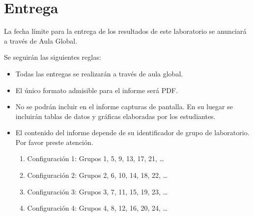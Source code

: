 \clearpage
\section{Entrega}

La fecha límite para la entrega de los resultados de este laboratorio 
se anunciará a través de Aula Global.

Se seguirán las siguientes reglas:

\begin{itemize}

  \item Todas las entregas se realizarán a través de aula global.

  \item El único formato admisible para el informe será PDF.

  \item No se podrán incluir en el informe capturas de pantalla.
        En su luegar se incluirán tablas de datos y gráficas elaboradas por los estudiantes.

  \item El contenido del informe depende de su identificador de grupo de laboratorio.
        Por favor preste atención.
  
  \begin{enumerate}
    \item Configuración 1: Grupos 1, 5, 9, 13, 17, 21, \ldots
    \item Configuración 2: Grupos 2, 6, 10, 14, 18, 22, \ldots
    \item Configuración 3: Grupos 3, 7, 11, 15, 19, 23, \ldots
    \item Configuración 4: Grupos 4, 8, 12, 16, 20, 24, \ldots
  \end{enumerate}
  
\end{itemize}

